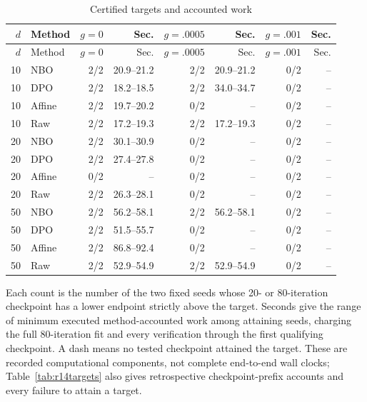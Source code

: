 \begingroup\small\setlength{\tabcolsep}{3pt}
\begin{longtable}{rlrrrrrr}
\caption{Certified targets and accounted work}\label{tab:r14targetsummary}\\
\toprule
$d$ & Method & $g=0$ & Sec. & $g=.0005$ & Sec. & $g=.001$ & Sec.\\\midrule
\endfirsthead
\toprule
$d$ & Method & $g=0$ & Sec. & $g=.0005$ & Sec. & $g=.001$ & Sec.\\\midrule
\endhead
10 & NBO & 2/2 & 20.9--21.2 & 2/2 & 20.9--21.2 & 0/2 & --\\
10 & DPO & 2/2 & 18.2--18.5 & 2/2 & 34.0--34.7 & 0/2 & --\\
10 & Affine & 2/2 & 19.7--20.2 & 0/2 & -- & 0/2 & --\\
10 & Raw & 2/2 & 17.2--19.3 & 2/2 & 17.2--19.3 & 0/2 & --\\
20 & NBO & 2/2 & 30.1--30.9 & 0/2 & -- & 0/2 & --\\
20 & DPO & 2/2 & 27.4--27.8 & 0/2 & -- & 0/2 & --\\
20 & Affine & 0/2 & -- & 0/2 & -- & 0/2 & --\\
20 & Raw & 2/2 & 26.3--28.1 & 0/2 & -- & 0/2 & --\\
50 & NBO & 2/2 & 56.2--58.1 & 2/2 & 56.2--58.1 & 0/2 & --\\
50 & DPO & 2/2 & 51.5--55.7 & 0/2 & -- & 0/2 & --\\
50 & Affine & 2/2 & 86.8--92.4 & 0/2 & -- & 0/2 & --\\
50 & Raw & 2/2 & 52.9--54.9 & 2/2 & 52.9--54.9 & 0/2 & --\\
\bottomrule\end{longtable}
\noindent Each count is the number of the two fixed seeds whose 20- or 80-iteration checkpoint has a lower endpoint strictly above the target. Seconds give the range of minimum executed method-accounted work among attaining seeds, charging the full 80-iteration fit and every verification through the first qualifying checkpoint. A dash means no tested checkpoint attained the target. These are recorded computational components, not complete end-to-end wall clocks; Table~\ref{tab:r14targets} also gives retrospective checkpoint-prefix accounts and every failure to attain a target.
\endgroup
